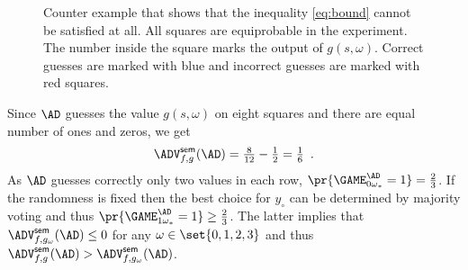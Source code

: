 \documentclass{crypto-exercise}
\begin{document}
\begin{solution}
\begin{figure}[!h]
\begin{center}
\end{center}
\caption{Counter example that shows that the inequality \eqref{eq:bound} cannot be satisfied at all. All squares are equiprobable in the experiment. The number inside the square marks the output of $g(s,\omega)$. Correct guesses are marked with blue  and incorrect guesses are marked with red squares.}
\label{fig:complete-counter-example}
\end{figure}
\noindent
Since $\AD$ guesses the value $g(s,\omega)$ on eight squares and there are equal number of ones and zeros, we get
\begin{align*}
\advSemXX{f,g}{\AD}={\textstyle\frac{8}{12}-\frac{1}{2}=\frac{1}{6} }\enspace.
\end{align*}
As $\AD$ guesses correctly only two values in each row, $\pr{\smash{\GAME_{0\omega_*}^\AD=1}}=\frac{2}{3}$.  
If the randomness is fixed then the best choice for $y_\circ$ can be determined by majority voting and thus $ \pr{\smash{\GAME_{1\omega_*}^\AD=1}} \geq\frac{2}{3}$. The latter implies that
$\advSemXX{f,g_\omega}{\AD}\leq 0$ for any $\omega\in\set{0,1,2,3}$ and thus $\advSemXX{f,g}{\AD}>\advSemXX{f,g_\omega}{\AD}$. 
\end{solution}
\end{document}
